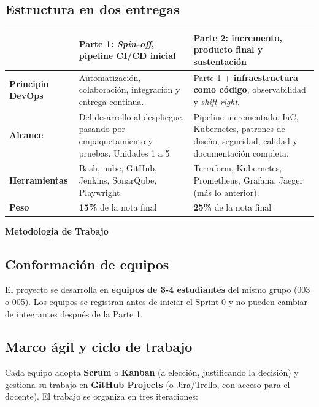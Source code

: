 \documentclass[10pt,letterpaper]{article}
\newcommand{\sectionBadge}[1]{%
  \refstepcounter{section}%
  \vspace{0.24cm}%
  \noindent%
  \colorbox{icesiBlue}{\color{white}\rule[-0.08cm]{0pt}{0.42cm}\hspace{0.16cm}\textbf{\normalsize \thesection}\hspace{0.16cm}}%
  \hspace{0.18cm}%
  {\fontsize{9.5}{12}\selectfont\textbf{\color{icesiDark}#1}}\\[-0.10cm]%
  \noindent{\color{icesiDark}\rule{\textwidth}{0.8pt}}\vspace{0.10cm}%
}
\begin{document}
\subsection{Estructura en dos entregas}
\noindent\small
\begin{tabularx}{\textwidth}{|L{2.6cm}|X|X|}
\hline
{}
 & \textbf{Parte 1: \textit{Spin-off}, pipeline CI/CD inicial} & \textbf{Parte 2: incremento, producto final y sustentación} \\ \hline
\textbf{Principio DevOps} & Automatización, colaboración, integración y entrega continua. & Parte 1 + \textbf{infraestructura como código}, observabilidad y \textit{shift-right}. \\ \hline
\textbf{Alcance} & Del desarrollo al despliegue, pasando por empaquetamiento y pruebas. Unidades 1 a 5. & Pipeline incrementado, IaC, Kubernetes, patrones de diseño, seguridad, calidad y documentación completa. \\ \hline
\textbf{Herramientas} & Bash, nube, GitHub, Jenkins, SonarQube, Playwright. & Terraform, Kubernetes, Prometheus, Grafana, Jaeger (más lo anterior). \\ \hline
\textbf{Peso} & \textbf{15\%} de la nota final & \textbf{25\%} de la nota final \\ \hline
\end{tabularx}

\sectionBadge{Metodología de Trabajo}

\subsection{Conformación de equipos}
El proyecto se desarrolla en \textbf{equipos de 3-4 estudiantes} del mismo grupo (003 o 005). Los equipos se registran antes de iniciar el Sprint 0 y no pueden cambiar de integrantes después de la Parte 1.

\subsection{Marco ágil y ciclo de trabajo}
Cada equipo adopta \textbf{Scrum} o \textbf{Kanban} (a elección, justificando la decisión) y gestiona su trabajo en \textbf{GitHub Projects} (o Jira/Trello, con acceso para el docente). El trabajo se organiza en tres iteraciones:
\end{document}
